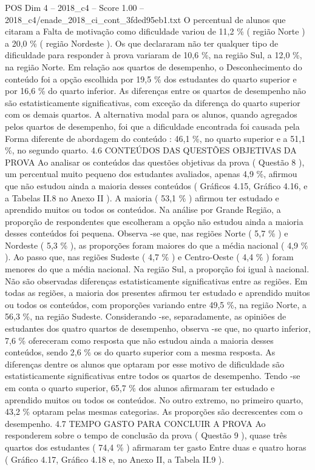 \begin{textsample}{POS Dim 4 – 2018\_c4 – Score 1.00 – 2018\_c4/enade\_2018\_ci\_cont\_3fded95eb1.txt}
O percentual de alunos que citaram a Falta de motivação como dificuldade variou de 11,2 \% ( região Norte ) a 20,0 \% ( região Nordeste ).
Os que declararam não ter qualquer tipo de dificuldade para responder à prova variaram de 10,6 \%, na região Sul, a 12,0 \%, na região Norte.
Em relação aos quartos de desempenho, o Desconhecimento do conteúdo foi a opção escolhida por 19,5 \% dos estudantes do quarto superior e por 16,6 \% do quarto inferior.
As diferenças entre os quartos de desempenho não são estatisticamente significativas, com exceção da diferença do quarto superior com os demais quartos.
A alternativa modal para os alunos, quando agregados pelos quartos de desempenho, foi que a dificuldade encontrada foi causada pela Forma diferente de abordagem do conteúdo : 46,1 \%, no quarto superior e a 51,1 \%, no segundo quarto. 4.6 CONTEÚDOS DAS QUESTÕES OBJETIVAS DA PROVA Ao analisar os conteúdos das questões objetivas da prova ( Questão 8 ), um percentual muito pequeno dos estudantes avaliados, apenas 4,9 \%, afirmou que não estudou ainda a maioria desses conteúdos ( Gráficos 4.15, Gráfico 4.16, e a Tabelas II.8 no Anexo II ).
A maioria ( 53,1 \% ) afirmou ter estudado e aprendido muitos ou todos os conteúdos.
Na análise por Grande Região, a proporção de respondentes que escolheram a opção não estudou ainda a maioria desses conteúdos foi pequena.
Observa -se que, nas regiões Norte ( 5,7 \% ) e Nordeste ( 5,3 \% ), as proporções foram maiores do que a média nacional ( 4,9 \% ).
Ao passo que, nas regiões Sudeste ( 4,7 \% ) e Centro-Oeste ( 4,4 \% ) foram menores do que a média nacional.
Na região Sul, a proporção foi igual à nacional.
Não são observadas diferenças estatisticamente significativas entre as regiões.
Em todas as regiões, a maioria dos presentes afirmou ter estudado e aprendido muitos ou todos os conteúdos, com proporções variando entre 49,5 \%, na região Norte, a 56,3 \%, na região Sudeste.
Considerando -se, separadamente, as opiniões de estudantes dos quatro quartos de desempenho, observa -se que, no quarto inferior, 7,6 \% ofereceram como resposta que não estudou ainda a maioria desses conteúdos, sendo 2,6 \% os do quarto superior com a mesma resposta.
As diferenças dentre os alunos que optaram por esse motivo de dificuldade são estatisticamente significativas entre todos os quartos de desempenho.
Tendo -se em conta o quarto superior, 65,7 \% dos alunos afirmaram ter estudado e aprendido muitos ou todos os conteúdos.
No outro extremo, no primeiro quarto, 43,2 \% optaram pelas mesmas categorias.
As proporções são decrescentes com o desempenho. 4.7 TEMPO GASTO PARA CONCLUIR A PROVA Ao responderem sobre o tempo de conclusão da prova ( Questão 9 ), quase três quartos dos estudantes ( 74,4 \% ) afirmaram ter gasto Entre duas e quatro horas ( Gráfico 4.17, Gráfico 4.18 e, no Anexo II, a Tabela II.9 ).

\end{textsample}
